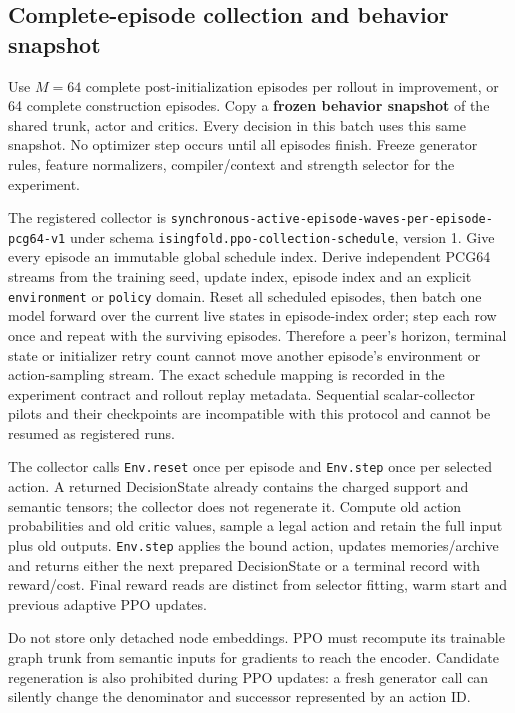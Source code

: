 \documentclass[10pt,a4paper]{article}
\begin{document}
\hypertarget{complete-episode-collection-and-behavior-snapshot}{%
\subsection{Complete-episode collection and behavior
snapshot}\label{complete-episode-collection-and-behavior-snapshot}}

Use \(M=64\) complete post-initialization episodes per rollout in
improvement, or 64 complete construction episodes. Copy a \textbf{frozen
behavior snapshot} of the shared trunk, actor and critics. Every
decision in this batch uses this same snapshot. No optimizer step occurs
until all episodes finish. Freeze generator rules, feature normalizers,
compiler/context and strength selector for the experiment.

The registered collector is
\texttt{synchronous-active-episode-waves-per-episode-pcg64-v1} under
schema \texttt{isingfold.ppo-collection-schedule}, version 1. Give every
episode an immutable global schedule index. Derive independent PCG64
streams from the training seed, update index, episode index and an
explicit \texttt{environment} or \texttt{policy} domain. Reset all
scheduled episodes, then batch one model forward over the current live
states in episode-index order; step each row once and repeat with the
surviving episodes. Therefore a peer's horizon, terminal state or
initializer retry count cannot move another episode's environment or
action-sampling stream. The exact schedule mapping is recorded in the
experiment contract and rollout replay metadata. Sequential
scalar-collector pilots and their checkpoints are incompatible with this
protocol and cannot be resumed as registered runs.

The collector calls \texttt{Env.reset} once per episode and
\texttt{Env.step} once per selected action. A returned DecisionState
already contains the charged support and semantic tensors; the collector
does not regenerate it. Compute old action probabilities and old critic
values, sample a legal action and retain the full input plus old
outputs. \texttt{Env.step} applies the bound action, updates
memories/archive and returns either the next prepared DecisionState or a
terminal record with reward/cost. Final reward reads are distinct from
selector fitting, warm start and previous adaptive PPO updates.

Do not store only detached node embeddings. PPO must recompute its
trainable graph trunk from semantic inputs for gradients to reach the
encoder. Candidate regeneration is also prohibited during PPO updates: a
fresh generator call can silently change the denominator and successor
represented by an action ID.
\end{document}
